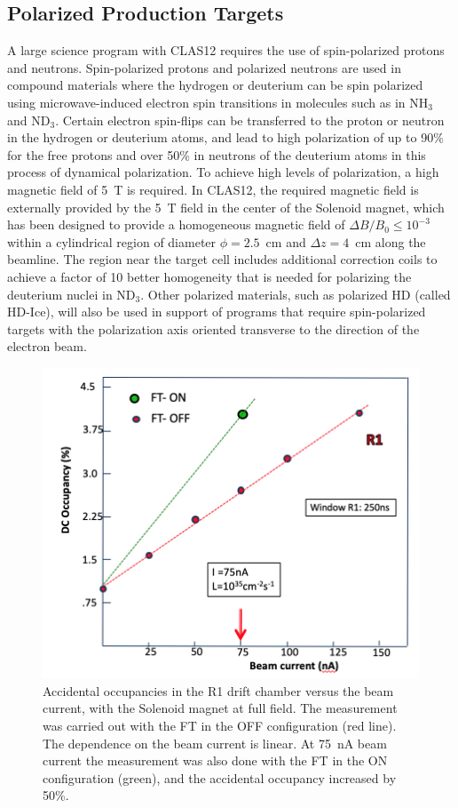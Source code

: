 \documentclass[final,3p,twocolumn]{elsarticle}
\begin{document}
 \subsection{Polarized Production Targets} 

A large science program with CLAS12 requires the use of spin-polarized protons and neutrons. Spin-polarized protons
and polarized neutrons are used in compound materials where the hydrogen or deuterium can be spin polarized using
microwave-induced electron spin transitions in molecules such as in NH$_3$ and ND$_3$. Certain electron spin-flips
can be transferred to the proton or neutron in the hydrogen or deuterium atoms, and lead to high polarization of up to
90\% for the free protons and over 50\% in neutrons of the deuterium atoms in this process of dynamical polarization.
To achieve high levels of polarization, a high magnetic field of 5~T is required. In CLAS12, the required magnetic 
field is externally provided by the 5~T field in the center of the Solenoid magnet, which has been designed to provide 
a homogeneous magnetic field of $\Delta B / B_0 \leq 10^{-3}$ within a cylindrical region of diameter $\phi = 2.5$~cm
and $\Delta{z} = 4$~cm along the beamline.  The region near the target cell includes additional correction coils to
achieve a factor of 10 better homogeneity that is needed for polarizing the deuterium nuclei in ND$_3$. Other polarized
materials, such as polarized HD (called HD-Ice), will also be used in support of programs that require spin-polarized
targets with the polarization axis oriented transverse to the direction of the electron beam.        

\begin{figure}[htbp!]
\centerline{\includegraphics[width=1.0\columnwidth]{DC1-occupancy.png}}
\caption{Accidental occupancies in the R1 drift chamber versus the beam current, with the Solenoid magnet at full 
field. The measurement was carried out with the FT in the OFF configuration (red line). The dependence on the beam
current is linear. At 75~nA beam current the measurement was also done with the FT in the ON configuration (green),
and the accidental occupancy increased by 50\%.}
\label{occupancies1}
\end{figure}
\end{document}
